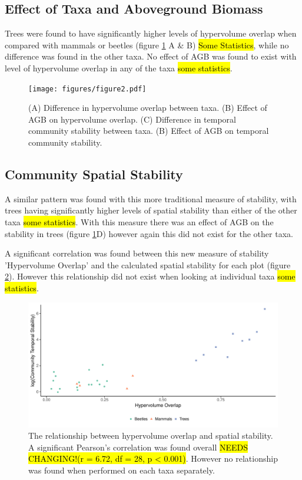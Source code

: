 \subsection{Effect of Taxa and Aboveground Biomass}

Trees were found to have significantly higher levels of hypervolume overlap when compared with mammals or beetles (figure \ref{fig:2} A \& B) \hl{Some Statistics}, while no difference was found in the other taxa. No effect of AGB was found to exist with level of hypervolume overlap in any of the taxa \hl{some statistics}.

\begin{figure}[H]
	\centering
	\texttt{[image: figures/figure2.pdf]}
	\caption{(A) Difference in hypervolume overlap between taxa. (B) Effect of AGB on hypervolume overlap. (C) Difference in temporal community stability between taxa. (B) Effect of AGB on temporal community stability.}
	\label{fig:2}
\end{figure}


\subsection{Community Spatial Stability}

A similar pattern was found with this more traditional measure of stability, with trees having significantly higher levels of spatial stability than either of the other taxa \hl{some statistics}. With this measure there was an effect of AGB on the stability in trees (figure \ref{fig:2}D) however again this did not exist for the other taxa.


A significant correlation was found between this new measure of stability 'Hypervolume Overlap' and the calculated spatial stability for each plot (figure \ref{fig:3}). However this relationship did not exist when looking at individual taxa \hl{some statistics}.

\begin{figure}[H]	
	\centering
	\includegraphics[width=\textwidth]{figures/figure3.pdf}
	\caption{The relationship between hypervolume overlap and spatial stability. A significant Pearson's correlation was found overall \hl{NEEDS CHANGING!(r = 6.72, df = 28, p < 0.001)}. However no relationship was found when performed on each taxa separately.}
	\label{fig:3}
\end{figure}
